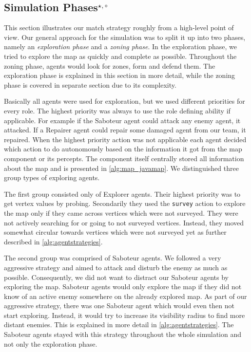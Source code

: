 \subsection[Simulation Phases]{Simulation Phases$^{\star,\circ}$}\label{arc:simulation}
This section illustrates our match strategy roughly from a high-level point of view.
Our general approach for the simulation was to split it up into two phases, namely an \emph{exploration phase} and a \emph{zoning phase}.
In the exploration phase, we tried to explore the map as quickly and complete as possible.
Throughout the zoning phase, agents would look for zones, form and defend them.
The exploration phase is explained in this section in more detail, while the zoning phase is covered in separate section due to its complexity.

Basically all agents were used for exploration, but we used different priorities for every role.
The highest priority was always to use the role defining ability if applicable.
For example if the Saboteur agent could attack any enemy agent, it attacked.
If a Repairer agent could repair some damaged agent from our team, it repaired.
When the highest priority action was not applicable each agent decided which action to do autonomously based on the information it got from the map component or its percepts.
The component itself centrally stored all information about the map and is presented in \autoref{alg:map_javamap}.
We distinguished three group types of exploring agents.

The first group consisted only of Explorer agents.
Their highest priority was to get vertex values by probing.
Secondarily they used the \texttt{survey} action to explore the map only if they came across vertices which were not surveyed.
They were not actively searching for or going to not surveyed vertices.
Instead, they moved somewhat circular towards vertices which were not surveyed yet as further described in \autoref{alg:agentstrategies}.

The second group was comprised of Saboteur agents.
We followed a very aggressive strategy and aimed to attack and disturb the enemy as much as possible.
Consequently, we did not want to distract our Saboteur agents by exploring the map.
Saboteur agents would only explore the map if they did not know of an active enemy somewhere on the already explored map.
As part of our aggressive strategy, there was one Saboteur agent which would even then not start exploring.
Instead, it would try to increase its visibility radius to find more distant enemies.
This is explained in more detail in \autoref{alg:agentstrategies}.
The Saboteur agents stayed with this strategy throughout the whole simulation and not only the exploration phase.

